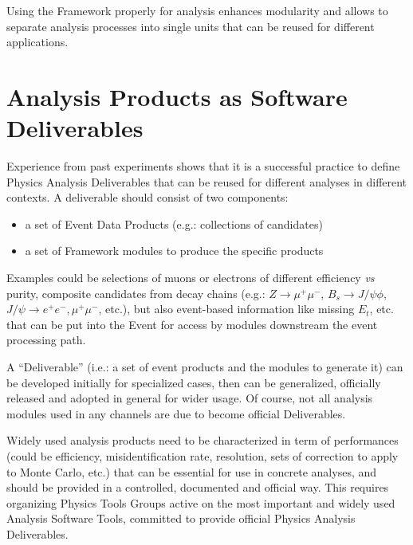 \documentclass[draftmode]{memarticle}
\begin{document}
Using the Framework properly for analysis enhances modularity 
and allows to separate analysis processes into single units
that can be reused for different applications.

\section{Analysis Products as Software Deliverables}

Experience from past experiments shows that it is a successful
practice to define Physics Analysis Deliverables that can be
reused for different analyses in different contexts. 
A deliverable should consist of two components:
\begin{itemize}
\item{} a set of Event Data Products (e.g.: collections of
candidates)
\item{} a set of Framework modules to produce the specific products
\end{itemize}
Examples could be selections of muons or electrons of different 
efficiency {\em vs} purity, composite candidates from decay
chains (e.g.: $Z\rightarrow \mu^+\mu^-$, $B_s\rightarrow J/\psi\phi$,
$J/\psi\rightarrow e^+e^-, \mu^+\mu^-$, etc.), but also
event-based information like missing $E_t$, etc. that can be
put into the Event for access by modules downstream the 
event processing path.

A ``Deliverable'' (i.e.: a set of event products and the modules 
to generate it) can be developed initially for specialized cases, 
then can be generalized, officially released and adopted in general 
for wider usage.
Of course, not all analysis modules used in any channels are due to become
official Deliverables.

Widely used analysis products need to be characterized in term of
performances (could be efficiency, misidentification rate, resolution,
sets of correction to apply to Monte Carlo, etc.) that can be essential 
for use in concrete analyses, and should be provided in a controlled,
documented and official way. 
This requires organizing Physics Tools Groups active
on the most important and widely used Analysis 
Software Tools, committed to provide 
official Physics Analysis Deliverables.
\end{document}
